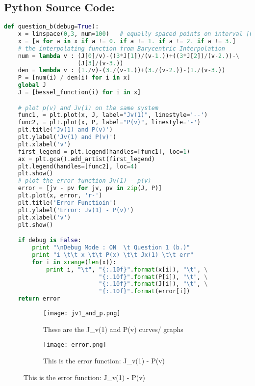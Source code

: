 \documentclass{article}
\begin{document}
\subsection*{Python Source Code: }
\begin{lstlisting}[language=Python]
def question_b(debug=True):
    x = linspace(0,3, num=100)   # equally spaced points on interval [0, 3]
    x = [a for a in x if a != 0. if a != 1. if a != 2. if a != 3.]
    # the interpolating function from Barycentric Interpolation
    num = lambda v : (J[0]/v)-((3*J[1])/(v-1.))+((3*J[2])/(v-2.))-\
                     (J[3]/(v-3.))
    den = lambda v : (1./v)-(3./(v-1.))+(3./(v-2.))-(1./(v-3.))
    P = [num(i) / den(i) for i in x]
    global J
    J = [bessel_function(i) for i in x]

    # plot p(v) and Jv(1) on the same system
    func1, = plt.plot(x, J, label="Jv(1)", linestyle='--')
    func2, = plt.plot(x, P, label="P(v)", linestyle='-')
    plt.title('Jv(1) and P(v)')
    plt.ylabel('Jv(1) and P(v)')
    plt.xlabel('v')
    first_legend = plt.legend(handles=[func1], loc=1)
    ax = plt.gca().add_artist(first_legend)
    plt.legend(handles=[func2], loc=4)
    plt.show()
    # plot the error function Jv(1) - p(v)
    error = [jv - pv for jv, pv in zip(J, P)]
    plt.plot(x, error, 'r-')
    plt.title('Error Functioin')
    plt.ylabel('Error: Jv(1) - P(v)')
    plt.xlabel('v')
    plt.show()

    if debug is False:
        print "\nDebug Mode : ON  \t Question 1 (b.)"
        print "i \t\t x \t\t P(x) \t\t Jx(1) \t\t err"
        for i in xrange(len(x)):
            print i, "\t", "{:.10f}".format(x[i]), "\t", \
                           "{:.10f}".format(P[i]), "\t", \
                           "{:.10f}".format(J[i]), "\t", \
                           "{:.10f}".format(error[i])
    return error
\end{lstlisting}
\pagebreak

\begin{figure}[h!]
  \centering
  \begin{subfigure}{\linewidth}
    \texttt{[image: jv1\_and\_p.png]}
    \caption{These are the J_v(1) and P(v) curves/ graphs }
  \end{subfigure}
  \begin{subfigure}{\linewidth}
    \texttt{[image: error.png]}
    \caption{This is the error function: J_v(1) - P(v)}
  \end{subfigure}
\end{figure}
\end{document}
